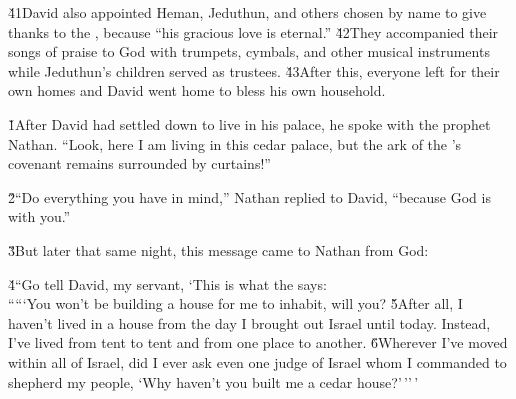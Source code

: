 \v{41}David also appointed Heman, Jeduthun, and others chosen by name to give thanks to the , because ``his gracious love is eternal.'' \v{42}They accompanied their songs of praise to God with trumpets, cymbals, and other musical instruments while Jeduthun's children served as trustees. \v{43}After this, everyone left for their own homes and David went home to bless his own household.

\v{1}After David had settled down to live in his palace, he spoke with the prophet Nathan. ``Look, here I am living in this cedar palace, but the ark of the 's covenant remains surrounded by curtains!''

\v{2}``Do everything you have in mind,'' Nathan replied to David, ``because God is with you.''

\v{3}But later that same night, this message came to Nathan from God:

\begin{poetry}
\poeml \v{4}``Go tell David, my servant, `This is what the  says: \\
\poeml `````You won't be building a house for me to inhabit, will you? \v{5}After all, I haven't lived in a house from the day I brought out Israel until today. Instead, I've lived from tent to tent and from one place to another. \v{6}Wherever I've moved within all of Israel, did I ever ask even one judge of Israel whom I commanded to shepherd my people, `Why haven't you built me a cedar house?'\,''\,'
\end{poetry}

